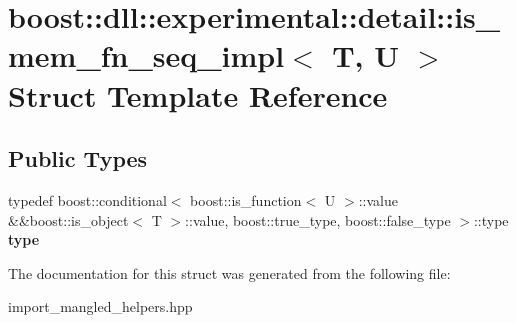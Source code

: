 \hypertarget{a01512}{}\section{boost\+:\+:dll\+:\+:experimental\+:\+:detail\+:\+:is\+\_\+mem\+\_\+fn\+\_\+seq\+\_\+impl$<$ T, U $>$ Struct Template Reference}
\label{a01512}
\subsection*{Public Types}
\begin{DoxyCompactItemize}
\item 
\mbox{\label{a01512_aec1a5860cdcd1498eaeb3ce7ee7f5373}} 
typedef boost\+::conditional$<$ boost\+::is\+\_\+function$<$ U $>$\+::value \&\&boost\+::is\+\_\+object$<$ T $>$\+::value, boost\+::true\+\_\+type, boost\+::false\+\_\+type $>$\+::type {\bfseries type}
\end{DoxyCompactItemize}


The documentation for this struct was generated from the following file\+:\begin{DoxyCompactItemize}
\item 
import\+\_\+mangled\+\_\+helpers.\+hpp\end{DoxyCompactItemize}
